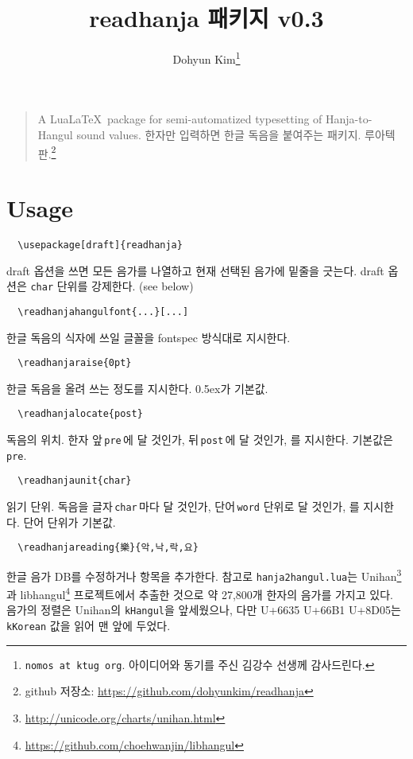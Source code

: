 \documentclass[b5paper]{article}
\begin{document}
\title{\ttfamily readhanja 패키지 v0.3}
\author{Dohyun Kim\thanks{\texttt{nomos at ktug org}.
  아이디어와 동기를 주신 김강수 선생께 감사드린다.}}
\maketitle

\begin{quote}
A Lua\LaTeX\ package for semi-automatized typesetting of
Hanja-to-Hangul sound values.
한자만 입력하면 한글 독음을 붙여주는 패키지. 루아텍 판.\footnote{
  github 저장소: \url{https://github.com/dohyunkim/readhanja}}
\end{quote}

\section*{Usage}

\begin{verbatim}
  \usepackage[draft]{readhanja}
\end{verbatim}
draft 옵션을 쓰면 모든 음가를 나열하고 현재 선택된 음가에
밑줄을 긋는다. draft 옵션은 \verb|char| 단위를 강제한다. (see below)

\begin{verbatim}
  \readhanjahangulfont{...}[...]
\end{verbatim}
한글 독음의 식자에 쓰일 글꼴을 fontspec 방식대로 지시한다.

\begin{verbatim}
  \readhanjaraise{0pt}
\end{verbatim}
한글 독음을 올려 쓰는 정도를 지시한다. 0.5ex가 기본값.

\begin{verbatim}
  \readhanjalocate{post}
\end{verbatim}
독음의 위치. 한자 앞\,\verb|pre|\,에 달 것인가, 뒤\,\verb|post|\,에 달 것인가, 를
지시한다.  기본값은 \verb|pre|.

\begin{verbatim}
  \readhanjaunit{char}
\end{verbatim}
읽기 단위. 독음을 글자\,\verb|char|\,마다 달 것인가, 단어\,\verb|word| 단위로
달 것인가, 를 지시한다. 단어 단위가 기본값.

\begin{verbatim}
  \readhanjareading{樂}{악,낙,락,요}
\end{verbatim}
한글 음가 DB를 수정하거나 항목을 추가한다. 참고로 \verb|hanja2hangul.lua|는
Unihan\footnote{\url{http://unicode.org/charts/unihan.html}}과
libhangul\footnote{\url{https://github.com/choehwanjin/libhangul}}
프로젝트에서 추출한 것으로 약 27,800개 한자의 음가를
가지고 있다. 음가의 정렬은 Unihan의 \verb|kHangul|을 앞세웠으나,
다만 \mbox{U+6635} \mbox{U+66B1} \mbox{U+8D05}는 \verb|kKorean| 값을 읽어 맨 앞에 두었다.
\end{document}
